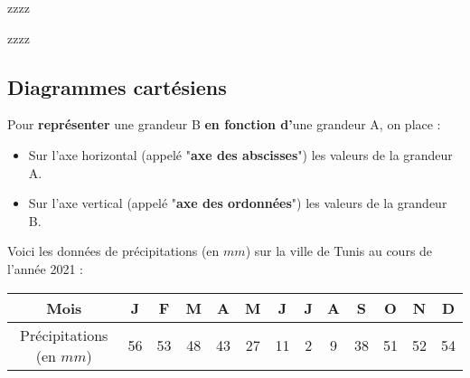 \begin{pageAD} 



zzzz
 


zzzz


\end{pageAD}


\begin{pageCours}

\section{Diagrammes cartésiens}

\begin{Def}
Pour \textbf{représenter} une grandeur B \textbf{en fonction d'}une grandeur A, on place :
\begin{itemize}
\item Sur l'axe horizontal (appelé "\textbf{axe des abscisses}") les valeurs de la grandeur A.
\item Sur l'axe vertical (appelé "\textbf{axe des ordonnées}") les valeurs de la grandeur B.
\end{itemize}
\end{Def}

\begin{Ex}
Voici les données de précipitations (en $mm$) sur la ville de Tunis au cours de l'année 2021 : 
\begin{center}
\begin{tabular}{|c|c|c|c|c|c|c|c|c|c|c|c|c|}\hline
Mois & J & F & M & A & M & J & J & A & S & O & N & D \\\hline
Précipitations (en $mm$) & 56 & 53 & 48 & 43 & 27 & 11 & 2 & 9 & 38 & 51 & 52 & 54 \\\hline
\end{tabular}
\end{center}
\end{Ex}

\end{pageCours}




